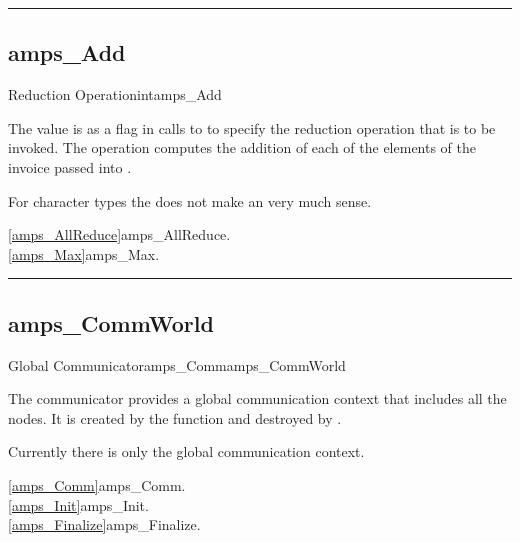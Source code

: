 \noindent\rule{\textwidth}{1mm}

\subsection{amps\_Add}
\label{amps_Add}

\begin{deftypevr}{Reduction Operation}{int}{amps\_Add}
\DESCRIPTION

The  value is as a flag in calls to  to
specify the reduction operation that is to be invoked.  The 
operation computes the addition of each of the elements of the
invoice passed into .

\NOTES
For character types the  does not make an very much
sense.

\SEEALSO
\vref{amps_AllReduce}{amps\_AllReduce}. \\
\vref{amps_Max}{amps\_Max}. \\

\end{deftypevr}


\noindent\rule{\textwidth}{1mm}

\subsection{amps\_CommWorld}
\label{amps_CommWorld}

\begin{deftypevr}{Global Communicator}{amps_Comm}{amps\_CommWorld}

\DESCRIPTION

The  communicator provides a global communication
context that includes all the nodes.  It is created by the
 function and destroyed by .

\NOTES
Currently there is only the global communication context.

\SEEALSO
\vref{amps_Comm}{amps\_Comm}. \\
\vref{amps_Init}{amps\_Init}. \\
\vref{amps_Finalize}{amps\_Finalize}. \\

\end{deftypevr}

